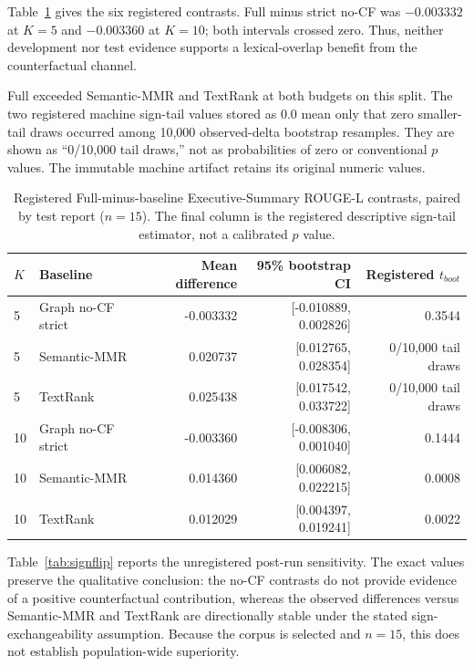 \documentclass[applsci,article,submit,moreauthors]{Definitions/mdpi}
\begin{document}
Table~\ref{tab:contrasts} gives the six registered contrasts. Full minus strict no-CF was $-0.003332$ at $K=5$ and $-0.003360$ at $K=10$; both intervals crossed zero. Thus, neither development nor test evidence supports a lexical-overlap benefit from the counterfactual channel.

Full exceeded Semantic-MMR and TextRank at both budgets on this split. The two registered machine sign-tail values stored as 0.0 mean only that zero smaller-tail draws occurred among 10,000 observed-delta bootstrap resamples. They are shown as ``0/10,000 tail draws,'' not as probabilities of zero or conventional $p$ values. The immutable machine artifact retains its original numeric values.

\begin{table}[H]
\caption{Registered Full-minus-baseline Executive-Summary ROUGE-L contrasts, paired by test report ($n=15$). The final column is the registered descriptive sign-tail estimator, not a calibrated $p$ value.}
\label{tab:contrasts}\centering\small
\begin{tabular}{llrrr}
\toprule
$K$ & Baseline & Mean difference & 95\% bootstrap CI & Registered $t_{boot}$\\
\midrule
5 & Graph no-CF strict & -0.003332 & [-0.010889, 0.002826] & 0.3544\\
5 & Semantic-MMR & 0.020737 & [0.012765, 0.028354] & 0/10,000 tail draws\\
5 & TextRank & 0.025438 & [0.017542, 0.033722] & 0/10,000 tail draws\\
10 & Graph no-CF strict & -0.003360 & [-0.008306, 0.001040] & 0.1444\\
10 & Semantic-MMR & 0.014360 & [0.006082, 0.022215] & 0.0008\\
10 & TextRank & 0.012029 & [0.004397, 0.019241] & 0.0022\\
\bottomrule
\end{tabular}
\end{table}

Table~\ref{tab:signflip} reports the unregistered post-run sensitivity. The exact values preserve the qualitative conclusion: the no-CF contrasts do not provide evidence of a positive counterfactual contribution, whereas the observed differences versus Semantic-MMR and TextRank are directionally stable under the stated sign-exchangeability assumption. Because the corpus is selected and $n=15$, this does not establish population-wide superiority.
\end{document}
